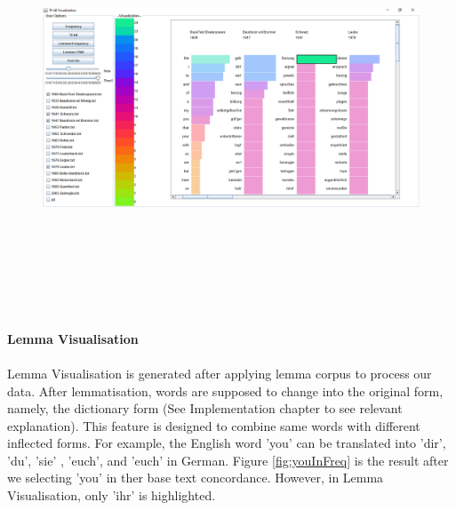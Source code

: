 \begin{figure}[h]
	\centering	
	\includegraphics[width=16cm, height=12cm]{Figs/Fassung}\\[1ex]
	\caption{}
	\label{fig:fassung}
\end{figure} 

\paragraph{Lemma Visualisation}
\paragraph[]{}Lemma Visualisation is generated after applying lemma corpus to process our data. After lemmatisation, words are supposed to change into the original form, namely, the dictionary form (See Implementation chapter to see relevant explanation). This feature is designed to combine same words with different inflected forms.
 For example, the English word 'you' can be translated into 'dir', 'du', 'sie' , 'euch', and 'euch' in German. Figure \ref{fig:youInFreq} is the result after we selecting 'you' in ther base text concordance. However, in Lemma Visualisation, only 'ihr' is highlighted.
 
